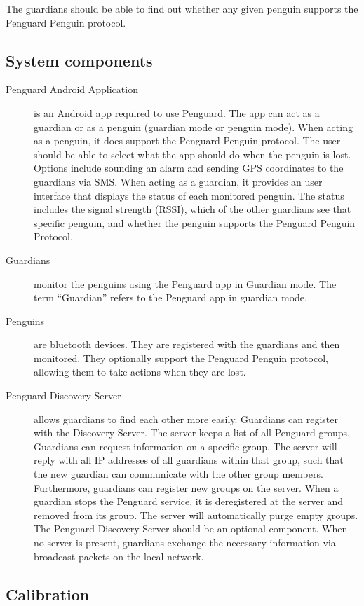 \documentclass{report}
\begin{document}
The guardians should be able to find out whether any given penguin supports the Penguard Penguin protocol.

\subsection{System components}

\begin{description}
    \item [Penguard Android Application] is an Android app required to use Penguard. The app can act as a guardian or as a penguin (guardian mode or penguin mode). When acting as a penguin, it does support the Penguard Penguin protocol. The user should be able to select what the app should do when the penguin is lost. Options include sounding an alarm and sending GPS coordinates to the guardians via SMS. When acting as a guardian, it provides an user interface that displays the status of each monitored penguin. The status includes the signal strength (RSSI), which of the other guardians see that specific penguin, and whether the penguin supports the Penguard Penguin Protocol.
    \item [Guardians] monitor the penguins using the Penguard app in Guardian mode. The term ``Guardian'' refers to the Penguard app in guardian mode.
    \item [Penguins] are bluetooth devices. They are registered with the guardians and then monitored. They optionally support the Penguard Penguin protocol, allowing them to take actions when they are lost.
    \item [Penguard Discovery Server] allows guardians to find each other more easily. Guardians can register with the Discovery Server. The server keeps a list of all Penguard groups. Guardians can request information on a specific group. The server will reply with all IP addresses of all guardians within that group, such that the new guardian can communicate with the other group members. Furthermore, guardians can register new groups on the server. When a guardian stops the Penguard service, it is deregistered at the server and removed from its group. The server will automatically purge empty groups. The Penguard Discovery Server should be an optional component. When no server is present, guardians exchange the necessary information via broadcast packets on the local network.
\end{description}

\subsection{Calibration}
\end{document}
